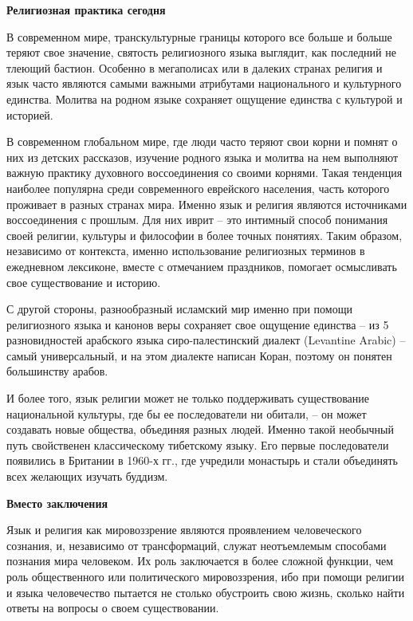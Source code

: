 \textbf{Религиозная практика сегодня}

В современном мире, транскультурные границы которого все больше и больше теряют свое значение, святость религиозного языка выглядит, как последний не тлеющий бастион. Особенно в мегаполисах или в далеких странах религия и язык часто являются самыми важными атрибутами национального и культурного единства. Молитва на родном языке сохраняет ощущение единства с культурой и историей.

В современном глобальном мире, где люди часто теряют свои корни и помнят о них из детских рассказов, изучение родного языка и молитва на нем выполняют важную практику духовного воссоединения со своими корнями. Такая тенденция наиболее популярна среди современного еврейского населения, часть которого проживает в разных странах мира. Именно язык и религия являются источниками воссоединения с прошлым. Для них иврит – это интимный способ понимания своей религии, культуры и философии в более точных понятиях. Таким образом, независимо от контекста, именно использование религиозных терминов в ежедневном лексиконе, вместе с отмечанием праздников, помогает осмысливать свое существование и историю.

С другой стороны, разнообразный исламский мир именно при помощи религиозного языка и канонов веры сохраняет свое ощущение единства – из 5 разновидностей арабского языка сиро-палестинский диалект (Levantine Arabic) – самый универсальный, и на этом диалекте написан Коран, поэтому он понятен большинству арабов.

И более того, язык религии может не только поддерживать существование национальной культуры, где бы ее последователи ни обитали, – он может создавать новые общества, объединяя разных людей. Именно такой необычный путь свойственен классическому тибетскому языку. Его первые последователи появились в Британии в 1960-х гг., где учредили монастырь и стали объединять всех желающих изучать буддизм.

\textbf{Вместо заключения}

Язык и религия как мировоззрение являются проявлением человеческого сознания, и, независимо от трансформаций, служат неотъемлемым способами познания мира человеком. Их роль заключается в более сложной функции, чем роль общественного или политического мировоззрения, ибо при помощи религии и языка человечество пытается не столько обустроить свою жизнь, сколько найти ответы на вопросы о своем существовании.
